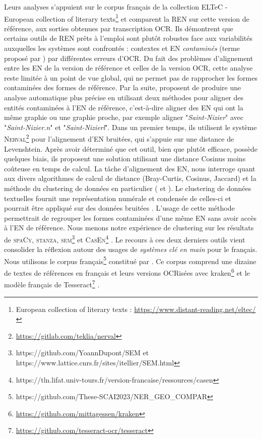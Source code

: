 Leurs analyses s'appuient sur le corpus français de la collection ELTeC - European collection of literary texts\footnote{European collection of literary texts : \url{https://www.distant-reading.net/eltec/}} et comparent la REN sur cette version de référence, aux sorties obtenues par transcription OCR. Ils démontrent que certains outils de REN prêts à l'emploi sont plutôt robustes face aux variabilités auxquelles les systèmes sont confrontés : contextes et EN \textit{contaminés} (terme proposé par \cite{hamdi:hal-03615997}) par différentes erreurs d'OCR. 
Du fait des problèmes d'alignement entre les EN de la version de référence et celles de la version OCR, cette analyse reste limitée à un point de vue global, qui ne permet pas de rapprocher les formes contaminées des formes de référence. Par la suite, \cite{koudoro2022reconnaissance} proposent de produire une analyse automatique plus précise en utilisant deux méthodes pour aligner des entités contaminées à l'EN de référence, c'est-à-dire aligner des EN qui ont la même graphie ou une graphie proche, par exemple aligner "\textit{Saint-Nizier}" avec "\textit{Saint-Nizier.n}" et "\textit{Saint-Nizierl}".
Dans un premier temps, ils utilisent le système \textsc{Nerval}\footnote{\url{https://gitlab.com/teklia/nerval}} pour l'alignement d'EN bruitées, qui s'appuie sur une distance de Levenshtein. Après avoir déterminé que cet outil, bien que plutôt efficace, possède quelques biais, ils proposent une solution utilisant une distance Cosinus moins coûteuse en temps de calcul. 
La tâche d'alignement des EN, nous interroge quant aux divers algorithmes de calcul de distance (Bray-Curtis, Cosinus, Jaccard) et la méthode du clustering de données en particulier (\cite{lin-1998-automatic} et \cite{green-etal-2012-entity}). Le clustering de données textuelles fournit une représentation numérale et condensée de celles-ci \cite{Loustau2013} et pourrait être appliqué sur des données bruitées \cite{brunet:hal-00851484}. L'usage de cette méthode permettrait de regrouper les formes contaminées d'une même EN sans avoir accès à l'EN de référence. Nous menons notre expérience de clustering sur les résultats de \textsc{spaCy}, \textsc{stanza}, \textsc{sem}\footnote{https://github.com/YoannDupont/SEM et https://www.lattice.cnrs.fr/sites/itellier/SEM.html} \cite{dupont-tellier:2014:TALN} et \textsc{CasEn}\footnote{https://tln.lifat.univ-tours.fr/version-francaise/ressources/casen} \cite{maurel:hal-00682805}. Le recours à ces deux derniers outils vient consolider la réflexion autour des usages de \textit{systèmes clé en main} pour le français. Nous utilisons le corpus français\footnote{https://github.com/These-SCAI2023/NER\_GEO\_COMPAR} constitué par \cite{DBLP:conf/gis/Koudoro-Parfait21}. Ce corpus comprend une dizaine de textes de références en français et leurs versions OCRisées avec kraken\footnote{\url{https://github.com/mittagessen/kraken}} et le modèle français de Tesseract\footnote{\url{https://github.com/tesseract-ocr/tesseract}} \cite{smith2007overview}.